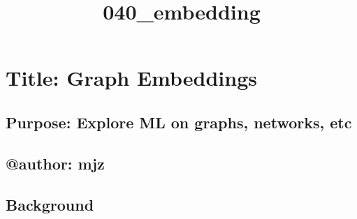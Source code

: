 \documentclass[11pt]{article}
\title{040\_embedding}
\begin{document}
    
    \maketitle
    
    

    
    \section{Title: Graph Embeddings}\label{title-graph-embeddings}

\subsection{Purpose: Explore ML on graphs, networks,
etc}\label{purpose-explore-ml-on-graphs-networks-etc}

\subsection{@author: mjz}\label{author-mjz}

    

    \subsection{Background}\label{background}
\end{document}
